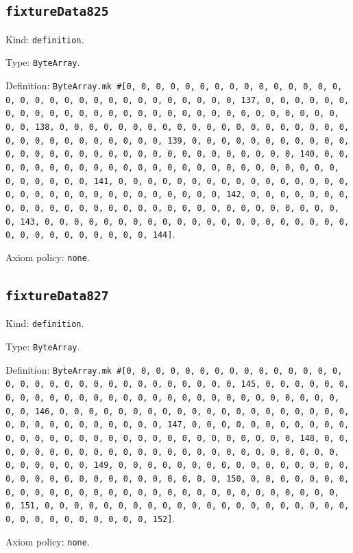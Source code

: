 \documentclass[11pt]{article}
\begin{document}
\subsection*{\texttt{fixtureData825}}
\noindent Kind: \texttt{definition}.\par
\noindent Type: \texttt{ByteArray}.\par
\noindent Definition: \texttt{ByteArray.mk \#[0, 0, 0, 0, 0, 0, 0, 0, 0, 0, 0, 0, 0, 0, 0, 0, 0, 0, 0, 0, 0, 0, 0, 0, 0, 0, 0, 0, 0, 0, 0, 137, 0, 0, 0, 0, 0, 0, 0, 0, 0, 0, 0, 0, 0, 0, 0, 0, 0, 0, 0, 0, 0, 0, 0, 0, 0, 0, 0, 0, 0, 0, 0, 138, 0, 0, 0, 0, 0, 0, 0, 0, 0, 0, 0, 0, 0, 0, 0, 0, 0, 0, 0, 0, 0, 0, 0, 0, 0, 0, 0, 0, 0, 0, 0, 139, 0, 0, 0, 0, 0, 0, 0, 0, 0, 0, 0, 0, 0, 0, 0, 0, 0, 0, 0, 0, 0, 0, 0, 0, 0, 0, 0, 0, 0, 0, 0, 140, 0, 0, 0, 0, 0, 0, 0, 0, 0, 0, 0, 0, 0, 0, 0, 0, 0, 0, 0, 0, 0, 0, 0, 0, 0, 0, 0, 0, 0, 0, 0, 141, 0, 0, 0, 0, 0, 0, 0, 0, 0, 0, 0, 0, 0, 0, 0, 0, 0, 0, 0, 0, 0, 0, 0, 0, 0, 0, 0, 0, 0, 0, 0, 142, 0, 0, 0, 0, 0, 0, 0, 0, 0, 0, 0, 0, 0, 0, 0, 0, 0, 0, 0, 0, 0, 0, 0, 0, 0, 0, 0, 0, 0, 0, 0, 143, 0, 0, 0, 0, 0, 0, 0, 0, 0, 0, 0, 0, 0, 0, 0, 0, 0, 0, 0, 0, 0, 0, 0, 0, 0, 0, 0, 0, 0, 0, 0, 144]}.\par
\noindent Axiom policy: \texttt{none}.\par
\subsection*{\texttt{fixtureData827}}
\noindent Kind: \texttt{definition}.\par
\noindent Type: \texttt{ByteArray}.\par
\noindent Definition: \texttt{ByteArray.mk \#[0, 0, 0, 0, 0, 0, 0, 0, 0, 0, 0, 0, 0, 0, 0, 0, 0, 0, 0, 0, 0, 0, 0, 0, 0, 0, 0, 0, 0, 0, 0, 145, 0, 0, 0, 0, 0, 0, 0, 0, 0, 0, 0, 0, 0, 0, 0, 0, 0, 0, 0, 0, 0, 0, 0, 0, 0, 0, 0, 0, 0, 0, 0, 146, 0, 0, 0, 0, 0, 0, 0, 0, 0, 0, 0, 0, 0, 0, 0, 0, 0, 0, 0, 0, 0, 0, 0, 0, 0, 0, 0, 0, 0, 0, 0, 147, 0, 0, 0, 0, 0, 0, 0, 0, 0, 0, 0, 0, 0, 0, 0, 0, 0, 0, 0, 0, 0, 0, 0, 0, 0, 0, 0, 0, 0, 0, 0, 148, 0, 0, 0, 0, 0, 0, 0, 0, 0, 0, 0, 0, 0, 0, 0, 0, 0, 0, 0, 0, 0, 0, 0, 0, 0, 0, 0, 0, 0, 0, 0, 149, 0, 0, 0, 0, 0, 0, 0, 0, 0, 0, 0, 0, 0, 0, 0, 0, 0, 0, 0, 0, 0, 0, 0, 0, 0, 0, 0, 0, 0, 0, 0, 150, 0, 0, 0, 0, 0, 0, 0, 0, 0, 0, 0, 0, 0, 0, 0, 0, 0, 0, 0, 0, 0, 0, 0, 0, 0, 0, 0, 0, 0, 0, 0, 151, 0, 0, 0, 0, 0, 0, 0, 0, 0, 0, 0, 0, 0, 0, 0, 0, 0, 0, 0, 0, 0, 0, 0, 0, 0, 0, 0, 0, 0, 0, 0, 152]}.\par
\noindent Axiom policy: \texttt{none}.\par
\end{document}

